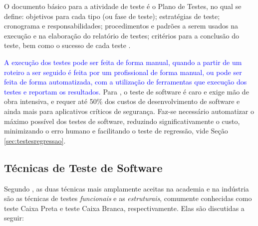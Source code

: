 O documento básico para a atividade de teste é o Plano de Testes, no qual se define: objetivos para cada tipo (ou fase de teste); estratégias de teste; cronograma e responsabilidades; procedimentos e padrões a serem usados na execução e na elaboração do relatório de testes; critérios para a conclusão do teste, bem como o sucesso de cada teste \cite{HIRAMA2011}.

\textcolor{blue}{A execução dos testes pode ser feita de forma manual, quando a partir de um roteiro a ser seguido é feita por um profissional de forma manual, ou pode ser feita de forma automatizada, com a utilização de ferramentas que execução dos testes e reportam os resultados.} Para , o teste de software é caro e exige mão de obra intensiva, e requer até 50\% dos custos de desenvolvimento de software e ainda mais para aplicativos críticos de segurança. Faz-se necessário automatizar o máximo possível dos testes de software, reduzindo significativamente o custo, minimizando o erro humano e facilitando o teste de regressão, vide Seção \ref{sec:testesregressao}.


\subsection{Técnicas de Teste de Software}


Segundo , as duas técnicas mais amplamente aceitas na academia e na indústria são as técnicas de testes \textit{funcionais} e as \textit{estruturais}, comumente conhecidas como teste Caixa Preta e teste Caixa Branca, respectivamente. Elas são discutidas a seguir:



